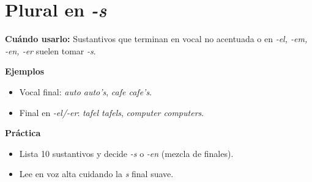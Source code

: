 \section{Plural en \textit{-s}}
\textbf{Cuándo usarlo:} Sustantivos que terminan en vocal no acentuada o en \textit{-el, -em, -en, -er} suelen tomar \textit{-s}.

\textbf{Ejemplos}
\begin{itemize}[leftmargin=*]
  \item Vocal final: \textit{auto \textrightarrow{} auto's}, \textit{cafe \textrightarrow{} cafe's}.
  \item Final en \textit{-el/-er}: \textit{tafel \textrightarrow{} tafels}, \textit{computer \textrightarrow{} computers}.
\end{itemize}

\textbf{Práctica}
\begin{itemize}[leftmargin=*]
  \item Lista 10 sustantivos y decide \textit{-s} o \textit{-en} (mezcla de finales).
  \item Lee en voz alta cuidando la \textit{s} final suave.
\end{itemize}
